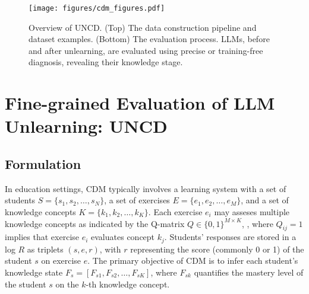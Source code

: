 \begin{figure}[t]
    \centering
    \texttt{[image: figures/cdm\_figures.pdf]}
    \caption{Overview of UNCD. (Top) The data construction pipeline and dataset examples. (Bottom) The evaluation process.  LLMs, before and after unlearning,   are evaluated using precise or training-free diagnosis, revealing their knowledge stage.  } \vspace{-0.2in}
    \label{fig:UNCD methodology}
\end{figure}



\section{Fine-grained Evaluation of LLM Unlearning: UNCD}

\subsection{Formulation} %


In education settings, CDM typically involves 
a learning system with a set of students \(\displaystyle S = \{s_1, s_2, \dots, s_N\}\), a set of exercises 
\(\displaystyle E = \{e_1, e_2, \dots, e_M\}\), and a set of knowledge concepts 
\(\displaystyle K = \{k_1, k_2, \dots, k_K\}\). Each exercise \( e_i \) may asseses multiple knowledge concepts as indicated by the Q-matrix \(\displaystyle Q \in \{0,1\}^{M \times K}\), , where \( Q_{ij} = 1 \) implies that exercise \( e_i \) evaluates concept \( k_j \).  Students’ responses are stored in a log 
\(\displaystyle R\) as triplets \((s, e, r)\), with \( r \) representing the score (commonly 0 or 1) of the student \( s \) on exercise \( e \). The primary objective of CDM is to infer each student's knowledge state \(\displaystyle F_s = [F_{s1}, F_{s2}, \dots, F_{sK}]\), where \(F_{sk}\) quantifies the mastery level of the student \(s\) on the \(k\)-th knowledge concept.

